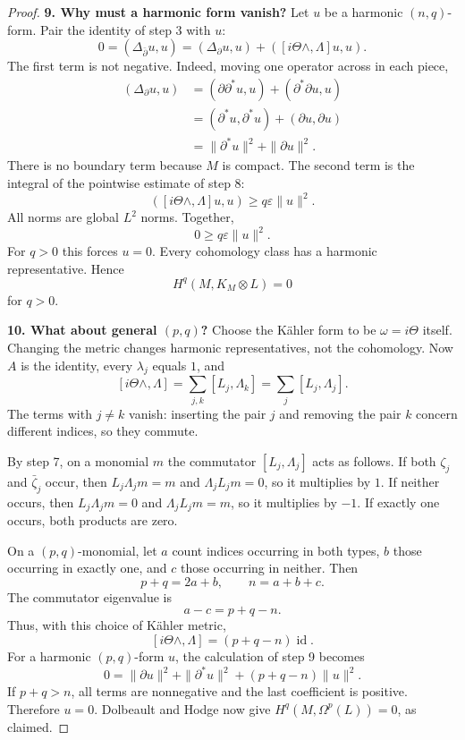 \begin{proof}
\medskip\noindent
{\bf 9. Why must a harmonic form vanish?}
Let $u$ be a harmonic $(n,q)$-form.
Pair the identity of step 3 with $u$:
$$
0=(\Delta_{\bar\partial}u,u)
=(\Delta_{\partial}u,u)
+([i\Theta\wedge,\Lambda]u,u).
$$
The first term is not negative. Indeed,
moving one operator across in each
piece,
$$
\begin{aligned}
(\Delta_{\partial}u,u)
&=(\partial\partial^*u,u)
+(\partial^*\partial u,u)\\
&=(\partial^*u,\partial^*u)
+(\partial u,\partial u)\\
&=\|\partial^*u\|^2+\|\partial u\|^2.
\end{aligned}
$$
There is no boundary term because $M$
is compact. The second term is the
integral of the pointwise estimate of
step 8:
$$
([i\Theta\wedge,\Lambda]u,u)
\geq q\varepsilon\|u\|^2.
$$
All norms are global $L^2$ norms.
Together,
$$
0\geq q\varepsilon\|u\|^2.
$$
For $q>0$ this forces $u=0$.
Every cohomology class has a harmonic
representative. Hence
$$
H^q(M,K_M\otimes L)=0
$$
for $q>0$.

\medskip\noindent
{\bf 10. What about general $(p,q)$?}
Choose the Kähler form to be
$\omega=i\Theta$ itself.
Changing the metric changes harmonic
representatives, not the cohomology.
Now $A$ is the identity, every
$\lambda_j$ equals $1$, and
$$
[i\Theta\wedge,\Lambda]
=\sum_{j,k}[L_j,\Lambda_k]
=\sum_j[L_j,\Lambda_j].
$$
The terms with $j\neq k$ vanish:
inserting the pair $j$ and removing the
pair $k$ concern different indices, so
they commute.

By step 7, on a monomial $m$ the
commutator $[L_j,\Lambda_j]$ acts as
follows. If both $\zeta_j$ and
$\bar\zeta_j$ occur, then
$L_j\Lambda_jm=m$ and
$\Lambda_jL_jm=0$, so it multiplies by
$1$. If neither occurs, then
$L_j\Lambda_jm=0$ and
$\Lambda_jL_jm=m$, so it multiplies by
$-1$. If exactly one occurs, both
products are zero.

On a $(p,q)$-monomial, let $a$
count indices occurring in both types,
$b$ those occurring in exactly one,
and $c$ those occurring in neither.
Then
$$
p+q=2a+b,\qquad n=a+b+c.
$$
The commutator eigenvalue is
$$
a-c=p+q-n.
$$
Thus, with this choice of Kähler metric,
$$
[i\Theta\wedge,\Lambda]
=(p+q-n)\operatorname{id}.
$$
For a harmonic $(p,q)$-form $u$, the
calculation of step 9 becomes
$$
0=\|\partial u\|^2+\|\partial^*u\|^2
+(p+q-n)\|u\|^2.
$$
If $p+q>n$, all terms are nonnegative
and the last coefficient is positive.
Therefore $u=0$.
Dolbeault and Hodge now give
$H^q(M,\Omega^p(L))=0$, as claimed.
\end{proof}

